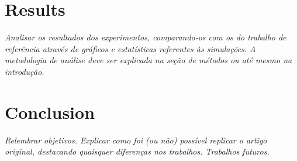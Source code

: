 \section{Results}

  \textit{Analisar os resultados dos experimentos, comparando-os com os do trabalho de referência através de gráficos e estatísticas referentes às simulações.
  A metodologia de análise deve ser explicada na seção de métodos ou até mesmo na introdução.}


\section{Conclusion}


  \textit{Relembrar objetivos.
  Explicar como foi (ou não) possível replicar o artigo original, destacando quaisquer diferenças nos trabalhos.
  Trabalhos futuros.}
